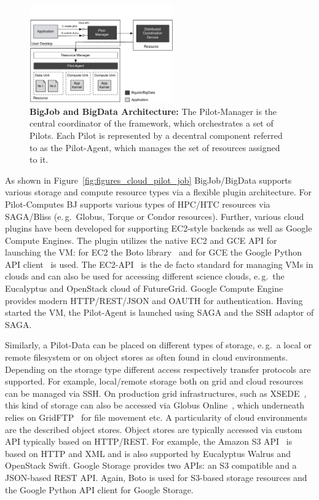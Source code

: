 \documentclass[times]{cpeauth}
\newcommand{\pilot}{Pilot\xspace}
\newcommand{\pilots}{Pilots\xspace}
\newcommand{\pilotcomputes}{Pilot-Computes\xspace}
\newcommand{\pilotdata}{Pilot-Data\xspace}
\newcommand{\upp}{\vspace*{-0.5em}}
\begin{document}
\begin{figure}
	\upp	\upp	\upp
	\centering
	\includegraphics[width=0.55\textwidth]{figures/bigjob-bigdata-architecture.pdf}
	\caption{\textbf{BigJob and BigData Architecture:} The \pilot-Manager is 
	the central coordinator of the framework, which orchestrates a set of 
	\pilots. Each \pilot is represented by a decentral component referred to 
	as the \pilot-Agent, which manages the set of resources assigned to it. }
	\label{fig:figures_bigjob-bigdata-architecture}
\end{figure}

As shown in Figure~\ref{fig:figures_cloud_pilot_job} BigJob/BigData supports
various storage and compute resource types via a flexible plugin architecture.
For \pilotcomputes BJ supports various types of HPC/HTC resources via
SAGA/Bliss (e.\,g.\ Globus, Torque or Condor resources). Further, various
cloud plugins have been developed for supporting EC2-style backends as well as
Google Compute Engines. The plugin utilizes the native EC2 and GCE API for
launching the VM: for EC2 the Boto library~\cite{boto} and for GCE 
the Google Python API client~\cite{google-api-client} is used.
The EC2-API~\cite{amazonec2api} is the de facto standard for
managing VMs in clouds and can also be used for accessing different science
clouds, e.\,g.\ the Eucalyptus and OpenStack cloud of FutureGrid. Google
Compute Engine provides modern HTTP/REST/JSON and OAUTH for authentication.
Having started the VM, the \pilot-Agent is launched using SAGA and the SSH
adaptor of SAGA.

Similarly, a \pilotdata can be placed on different types of storage, e.\,g.\ a
local or remote filesystem or on object stores as often found in cloud
environments. Depending on the storage type different access respectively
transfer protocols are supported. For example, local/remote storage both on
grid and cloud resources can be managed via SSH. On production grid
infrastructures, such as XSEDE~\cite{xsede}, this kind of storage can also be
accessed via Globus Online~\cite{10.1109/MIC.2011.64}, which underneath relies
on GridFTP~\cite{ogf-gfd-20} for file movement etc. A particularity of cloud
environments are the described object stores. Object stores are typically
accessed via custom API typically based on HTTP/REST. For example, the Amazon
S3 API~\cite{amazons3api} is based on HTTP and XML and is also supported by
Eucalyptus Walrus and OpenStack Swift. Google Storage provides two APIs: an S3 
compatible and a JSON-based REST API. Again, Boto is used for S3-based storage 
resources and the Google Python API client for Google Storage. 
\end{document}

